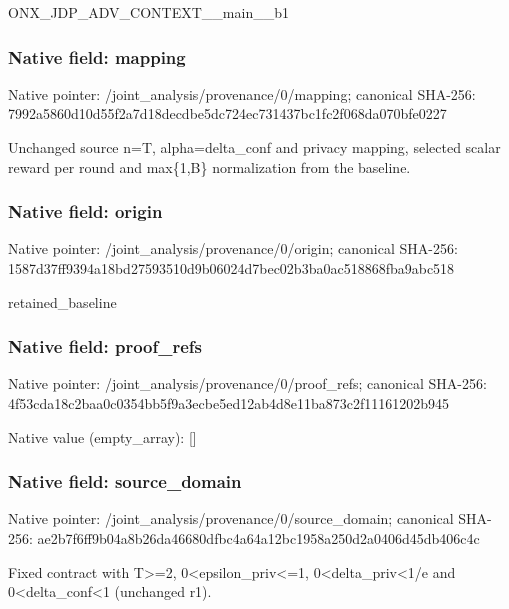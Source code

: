 \documentclass[10pt,a4paper]{article}
\begin{document}
\begingroup\raggedright\sloppy ONX\_\allowbreak{}JDP\_\allowbreak{}ADV\_\allowbreak{}CONTEXT\_\allowbreak{}\_\allowbreak{}main\_\allowbreak{}\_\allowbreak{}b1\par\endgroup

\subsubsection{Native field: mapping}
Native pointer: /joint\_\allowbreak{}analysis/provenance/0/mapping; canonical SHA-256: 7992a5860d10d55f2a7d18decdbe5dc724ec731437bc1fc2f068da070bfe0227

\begingroup\raggedright\sloppy Unchanged source n=\allowbreak{}T,\allowbreak{} alpha=\allowbreak{}delta\_\allowbreak{}conf and privacy mapping,\allowbreak{} selected scalar reward per round and max\{1,\allowbreak{}B\} normalization from the baseline.\par\endgroup

\subsubsection{Native field: origin}
Native pointer: /joint\_\allowbreak{}analysis/provenance/0/origin; canonical SHA-256: 1587d37ff9394a18bd27593510d9b06024d7bec02b3ba0ac518868fba9abc518

\begingroup\raggedright\sloppy retained\_\allowbreak{}baseline\par\endgroup

\subsubsection{Native field: proof\_\allowbreak{}refs}
Native pointer: /joint\_\allowbreak{}analysis/provenance/0/proof\_\allowbreak{}refs; canonical SHA-256: 4f53cda18c2baa0c0354bb5f9a3ecbe5ed12ab4d8e11ba873c2f11161202b945

Native value (empty\_\allowbreak{}array): []

\subsubsection{Native field: source\_\allowbreak{}domain}
Native pointer: /joint\_\allowbreak{}analysis/provenance/0/source\_\allowbreak{}domain; canonical SHA-256: ae2b7f6ff9b04a8b26da46680dfbc4a64a12bc1958a250d2a0406d45db406c4c

\begingroup\raggedright\sloppy Fixed contract with T>=\allowbreak{}2,\allowbreak{} 0<epsilon\_\allowbreak{}priv<=\allowbreak{}1,\allowbreak{} 0<delta\_\allowbreak{}priv<1/\allowbreak{}e and 0<delta\_\allowbreak{}conf<1 (unchanged r1).\par\endgroup
\end{document}
